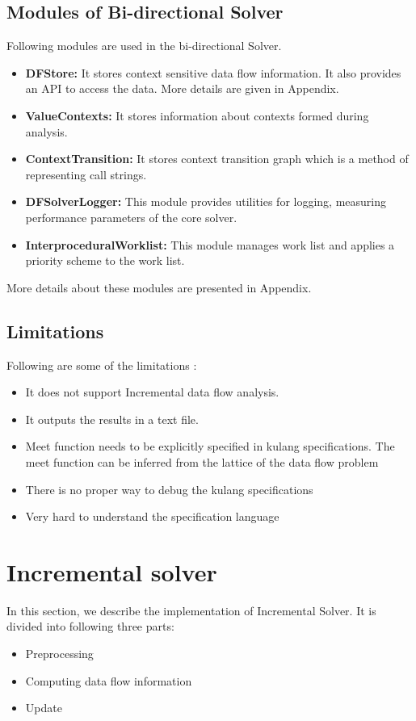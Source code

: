 \documentclass[11pt,a4paper,openright]{report}
\begin{document}
\subsection{Modules of Bi-directional Solver}
Following modules are used in the bi-directional Solver.
\begin{itemize}
 \item \textbf{DFStore:} It stores context sensitive data flow information. It also provides an API to access the data. More details are given in Appendix.
 \item \textbf{ValueContexts:} It stores information about contexts formed during analysis.
 \item \textbf{ContextTransition:} It stores context transition graph which is a method of representing call strings.
 \item \textbf{DFSolverLogger:} This module provides utilities for logging, measuring performance parameters of the core solver.
 \item \textbf{InterproceduralWorklist:} This module manages work list and applies a priority scheme to the work list.
\end{itemize}

More details about these modules are presented in Appendix.

\subsection{Limitations}
Following are some of the limitations :
\begin{itemize}
 \item It does not support Incremental data flow analysis.
 \item It outputs the results in a text file. 
 \item Meet function needs to be explicitly specified in kulang specifications. The meet function can be inferred from
the lattice of the data flow problem
\item There is no proper way to debug the kulang specifications
 \item Very hard to understand the specification language
\end{itemize}

\section{Incremental solver}
In this section, we describe the implementation of Incremental Solver. It is divided into following three parts:
\begin{itemize}
 \item Preprocessing
 \item Computing data flow information
 \item Update
\end{itemize}
\end{document}
